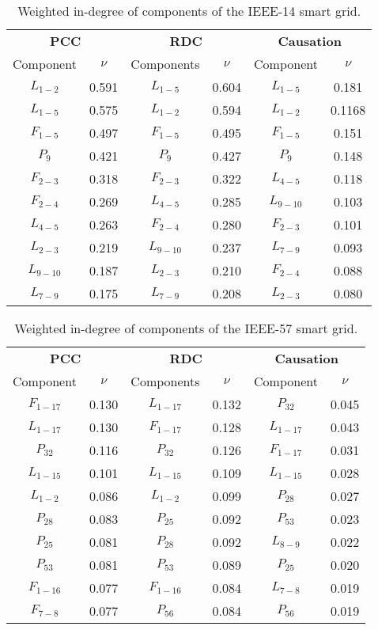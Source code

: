 \begin{table}[H]
\centering
\caption{Weighted in-degree of components of the IEEE-14 smart grid.}
\label{tab:nu_ieee14}
\footnotesize
\begin{tabular}{cc|cc|cc}
\multicolumn{2}{c}{\textbf{PCC}} & \multicolumn{2}{c}{\textbf{RDC}} & \multicolumn{2}{c}{\textbf{Causation}} \\
Component & $\nu$ & Components & $\nu$ & Component & $\nu$ \\ \hline
$L_{1-2}$ & 0.591 & $L_{1-5}$ & 0.604 & $L_{1-5}$ & 0.181 \\
$L_{1-5}$ & 0.575 & $L_{1-2}$ & 0.594 & $L_{1-2}$ & 0.1168 \\
$F_{1-5}$ & 0.497 & $F_{1-5}$ & 0.495 & $F_{1-5}$ & 0.151 \\
$P_{9}$ & 0.421 & $P_{9}$ & 0.427 & $P_{9}$ & 0.148 \\
$F_{2-3}$ & 0.318 & $F_{2-3}$ & 0.322 & $L_{4-5}$ & 0.118 \\
$F_{2-4}$ & 0.269 & $L_{4-5}$ & 0.285 & $L_{9-10}$ & 0.103 \\
$L_{4-5}$ & 0.263 & $F_{2-4}$ & 0.280 & $F_{2-3}$ & 0.101 \\
$L_{2-3}$ & 0.219 & $L_{9-10}$ & 0.237 & $L_{7-9}$ & 0.093 \\
$L_{9-10}$ & 0.187 & $L_{2-3}$ & 0.210 & $F_{2-4}$ & 0.088 \\
$L_{7-9}$ & 0.175 & $L_{7-9}$ & 0.208 & $L_{2-3}$ & 0.080
\end{tabular}
\end{table}

\begin{table}[H]
\centering
\caption{Weighted in-degree of components of the IEEE-57 smart grid.}
\label{tab:nu_ieee57}
\footnotesize
\begin{tabular}{cc|cc|cc}
\multicolumn{2}{c}{\textbf{PCC}} & \multicolumn{2}{c}{\textbf{RDC}} & \multicolumn{2}{c}{\textbf{Causation}} \\
Component & $\nu$ & Components & $\nu$ & Component & $\nu$ \\ \hline
$F_{1-17}$ & 0.130 & $L_{1-17}$ & 0.132 & $P_{32}$ & 0.045 \\
$L_{1-17}$ & 0.130 & $F_{1-17}$ & 0.128 & $L_{1-17}$ & 0.043 \\
$P_{32}$ & 0.116 & $P_{32}$ & 0.126 & $F_{1-17}$ & 0.031 \\
$L_{1-15}$ & 0.101 & $L_{1-15}$ & 0.109 & $L_{1-15}$ & 0.028 \\
$L_{1-2}$ & 0.086 & $L_{1-2}$ & 0.099 & $P_{28}$ & 0.027 \\
$P_{28}$ & 0.083 & $P_{25}$ & 0.092 & $P_{53}$ & 0.023 \\
$P_{25}$ & 0.081 & $P_{28}$ & 0.092 & $L_{8-9}$ & 0.022 \\
$P_{53}$ & 0.081 & $P_{53}$ & 0.089 & $P_{25}$ & 0.020 \\
$F_{1-16}$ & 0.077 & $F_{1-16}$ & 0.084 & $L_{7-8}$ & 0.019 \\
$F_{7-8}$ & 0.077 & $P_{56}$ & 0.084 & $P_{56}$ & 0.019
\end{tabular}
\end{table} 